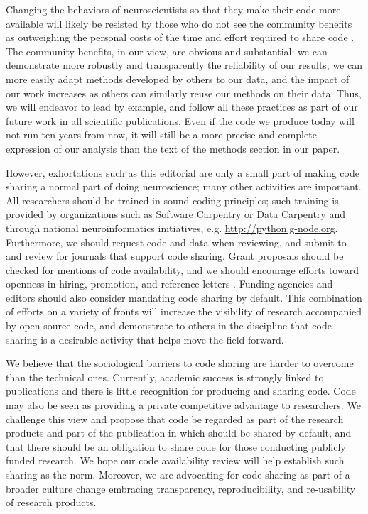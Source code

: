 \documentclass[11pt]{article}
\begin{document}
Changing the behaviors of neuroscientists so that they make their code more
available will likely be resisted by those who do not see the community
benefits as outweighing the personal costs of the time and effort required to
share code \cite{stodden2010scientific}. The community benefits, in our view,
are obvious and substantial: we can demonstrate more robustly and transparently
the reliability of our results, we can more easily adapt methods developed by
others to our data, and the impact of our work increases as others can
similarly reuse our methods on their data. Thus, we will endeavor to lead by
example, and follow all these practices as part of our future work in all
scientific publications. Even if the code we produce today will not run ten
years from now, it will still be a more precise and complete expression of our
analysis than the text of the methods section in our paper. 

However, exhortations such as this editorial are only a small part of
making code sharing a normal part of doing neuroscience; many other
activities are important.  All researchers should be trained in sound
coding principles; such training is provided by organizations such as
Software Carpentry \cite{wilson_best_2014} or Data Carpentry and
through national neuroinformatics initiatives,
e.g. \url{http://python.g-node.org}.  Furthermore, we should request
code and data when reviewing, and submit to and review for journals
that support code sharing.  Grant proposals should be checked for
mentions of code availability, and we should encourage efforts toward
openness in hiring, promotion, and reference letters
\cite{leveque2012reproducible}. Funding agencies and editors should
also consider mandating code sharing by default.  This combination of
efforts on a variety of fronts will increase the visibility of
research accompanied by open source code, and demonstrate to others in
the discipline that code sharing is a desirable activity that helps
move the field forward.

We believe that the sociological barriers to code sharing are harder
to overcome than the technical ones. Currently, academic success is
strongly linked to publications and there is little recognition for
producing and sharing code. Code may also be seen as providing a
private competitive advantage to researchers. We challenge this view
and propose that code be regarded as part of the research products and
part of the publication in which should be shared by default, and that
there should be an obligation to share code for those conducting
publicly funded research. We hope our code availability review will
help establish such sharing as the norm.  Moreover, we are advocating
for code sharing as part of a broader culture change embracing
transparency, reproducibility, and re-usability of research products.
\end{document}
